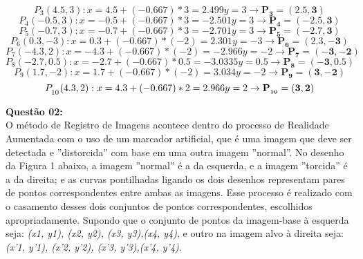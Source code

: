 \vspace{0.1cm}
\[
P_3(4.5, 3): x = 4.5 + (-0.667)*3 = 2.499 y = 3 \rightarrow \mathbf{P_3 = (2.5, 3)}
\]
\vspace{0.1cm}
\[
P_4(-0.5, 3): x = -0.5 + (-0.667)*3 = -2.501 y = 3 \rightarrow \mathbf{P_4 = (-2.5, 3)}
\]
\vspace{0.1cm}
\[
P_5(-0.7, 3): x = -0.7 + (-0.667)*3 = -2.701 y = 3 \rightarrow \mathbf{P_5 = (-2.7, 3)}
\]
\vspace{0.1cm}
\[
P_6(0.3, -3): x = 0.3 + (-0.667)*(-2) = 2.301 y = -3 \rightarrow \mathbf{P_6 = (2.3, -3)}
\]
\vspace{0.1cm}
\[
P_7(-4.3, 2): x = -4.3 + (-0.667)*(-2) = -2.966 y = -2 \rightarrow \mathbf{P_7 = (-3, -2)}
\]
\vspace{0.1cm}
\[
P_8(-2.7, 0.5): x = -2.7 + (-0.667)*0.5 = -3.0335 y = 0.5 \rightarrow \mathbf{P_8 = (-3, 0.5)}
\]
\vspace{0.1cm}
\[
P_9(1.7, -2): x = 1.7 + (-0.667)*(-2) = 3.034 y = -2 \rightarrow \mathbf{P_9 = (3, -2)}
\]
\vspace{0.1cm}
\[
P_\textsubscript{10}(4.3, 2): x = 4.3 + (-0.667)*2 = 2.966 y = 2 \rightarrow \mathbf{P_\textbf{\textsubscript{10}} = (3, 2)}
\]
\vspace{0.5 cm}

\noindent\textbf{Questão 02:} \\
O método de Registro de Imagens acontece dentro do processo de Realidade Aumentada com o uso de um marcador artificial, que é uma imagem que deve ser detectada e ”distorcida” com base em uma outra imagem ”normal”. No desenho da Figura 1 abaixo, a imagem ”normal” é a da esquerda, e a imagem ”torcida” é a da direita; e as curvas pontilhadas ligando os dois desenhos representam pares de pontos correspondentes entre ambas as imagens. Esse processo é realizado com o casamento desses dois conjuntos de pontos correspondentes, escolhidos apropriadamente. Supondo que o conjunto de pontos da imagem-base à esquerda seja: \emph{(x1, y1), (x2, y2), (x3, y3),(x4, y4)}, e outro na imagem alvo à direita seja: \emph{(x'1, y'1), (x'2, y'2), (x'3, y'3),(x'4, y'4)}.

